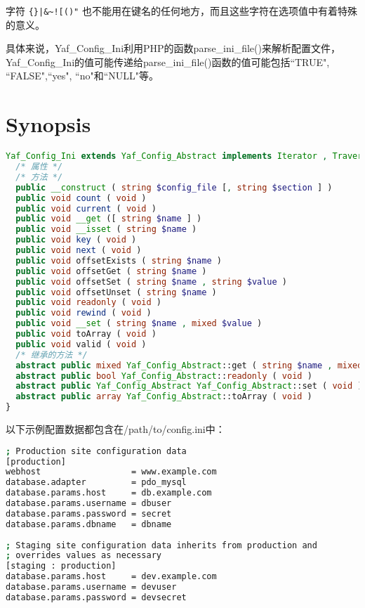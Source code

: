 字符 \texttt{\{\}|\&\~{}![()"} 也不能用在键名的任何地方，而且这些字符在选项值中有着特殊的意义。

具体来说，Yaf\_Config\_Ini利用PHP的函数parse\_ini\_file()来解析配置文件，Yaf\_Config\_Ini的值可能传递给parse\_ini\_file()函数的值可能包括``TRUE", ``FALSE",``yes", ``no"和``NULL"等。


\section{Synopsis}


\begin{lstlisting}[language=PHP]
Yaf_Config_Ini extends Yaf_Config_Abstract implements Iterator , Traversable , ArrayAccess , Countable {
  /* 属性 */
  /* 方法 */
  public __construct ( string $config_file [, string $section ] )
  public void count ( void )
  public void current ( void )
  public void __get ([ string $name ] )
  public void __isset ( string $name )
  public void key ( void )
  public void next ( void )
  public void offsetExists ( string $name )
  public void offsetGet ( string $name )
  public void offsetSet ( string $name , string $value )
  public void offsetUnset ( string $name )
  public void readonly ( void )
  public void rewind ( void )
  public void __set ( string $name , mixed $value )
  public void toArray ( void )
  public void valid ( void )
  /* 继承的方法 */
  abstract public mixed Yaf_Config_Abstract::get ( string $name , mixed $value )
  abstract public bool Yaf_Config_Abstract::readonly ( void )
  abstract public Yaf_Config_Abstract Yaf_Config_Abstract::set ( void )
  abstract public array Yaf_Config_Abstract::toArray ( void )
}
\end{lstlisting}


以下示例配置数据都包含在/path/to/config.ini中：

\begin{lstlisting}[language=bash]
; Production site configuration data
[production]
webhost                  = www.example.com
database.adapter         = pdo_mysql
database.params.host     = db.example.com
database.params.username = dbuser
database.params.password = secret
database.params.dbname   = dbname
 
; Staging site configuration data inherits from production and
; overrides values as necessary
[staging : production]
database.params.host     = dev.example.com
database.params.username = devuser
database.params.password = devsecret
\end{lstlisting}



